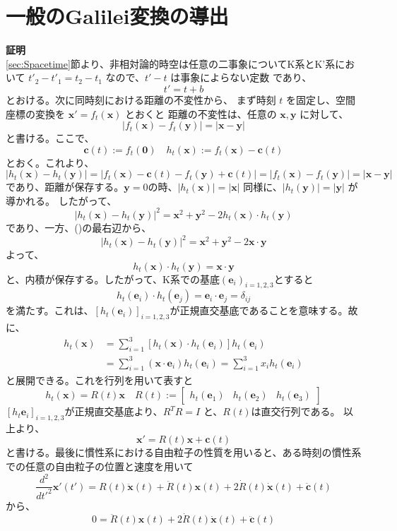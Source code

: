 \documentclass[a4paper,11pt]{ltjsarticle}
\begin{document}
\section{一般のGalilei変換の導出}
\label{sec:Hosoku}
\textbf{証明}
\\\ref{sec:Spacetime}節より、非相対論的時空は任意の二事象についてK系とK'系において \(t'_2-t'_1=t_2-t_1\) なので、\(t'-t\) は事象によらない定数
であり、
\[
t'=t+b
\]
とおける。次に同時刻における距離の不変性から、
まず時刻 \(t\) を固定し、空間座標の変換を \(\bm x'=f_t(\bm x)\) とおくと
距離の不変性は、任意の \(\bm x,\bm y\) に対して、
\[
|f_t(\bm{x})-f_t(\bm{y})|=|\bm{x}-\bm{y}|
\]
と書ける。ここで、
\[
\bm{c}(t):=f_t(\bm{0}) \quad h_t(\bm{x}):=f_t(\bm{x})-\bm{c}(t)
\]
とおく。これより、
\begin{equation}
|h_t(\bm{x})-h_t(\bm{y})|=|f_t(\bm{x})-\bm{c}(t)-f_t(\bm{y})+\bm{c}(t)|=|{f_t(\bm{x})}-f_t(\bm{y})|=|\bm{x}-\bm{y}|
\label{eq:h}
\end{equation}
であり、距離が保存する。$\bm{y}=0$の時、$|h_t(\bm{x})|=|\bm{x}|$ 同様に、$|h_t(\bm{y})|=|\bm{y}|$ が導かれる。
したがって、
\[
|h_t(\bm{x})-h_t(\bm{y})|^2=\bm{x}^2+\bm{y}^2-2h_t(\bm{x})\cdot h_t(\bm{y})
\]
であり、一方、()の最右辺から、
\[
|h_t(\bm{x})-h_t(\bm{y})|^2=\bm{x}^2+\bm{y}^2-2\bm{x}\cdot\bm{y}
\]
よって、
\[
h_t(\bm{x})\cdot h_t(\bm{y})=\bm{x}\cdot\bm{y}
\]
と、内積が保存する。したがって、K系での基底$(\bm{e}_i)_{i=1,2,3}$とすると
\[
h_t(\bm{e}_i)\cdot h_t(\bm{e}_j)=\bm{e}_i\cdot\bm{e}_j=\delta_{ij}
\]
を満たす。これは、$[h_t(\bm{e}_i)]_{i=1,2,3}$が正規直交基底であることを意味する。故に、
\begin{align*}
h_t(\bm{x})&=\sum_{i=1}^{3}\left[h_t(\bm{x})\cdot h_t(\bm{e}_i)\right]h_t(\bm{e}_i)
\\&=\sum_{i=1}^{3}(\bm{x}\cdot\bm{e}_i)h_t(\bm{e}_i)=\sum_{i=1}^{3}x_ih_t(\bm{e}_i)
\end{align*}
と展開できる。これを行列を用いて表すと
\[
h_t(\bm{x})=R(t)\bm{x} \quad R(t):=\begin{bmatrix}h_t(\bm{e}_1) & h_t(\bm{e}_2) & h_t(\bm{e}_3)\end{bmatrix}
\]
$[h_t{\bm{e}_i}]_{i=1,2,3}$が正規直交基底より、$R^TR=I$ と、$R(t)$は直交行列である。
以上より、
\[
\bm{x}'=R(t)\bm{x}+\bm{c}(t)
\]
と書ける。最後に慣性系における自由粒子の性質を用いると、ある時刻の慣性系での任意の自由粒子の位置と速度を用いて
\[
\frac{d^2}{dt'^2}\bm{x}'(t')=R(t)\ddot{\bm{x}}(t)+\ddot{R}(t)\bm{x}(t)+2\dot{R}(t)\dot{\bm{x}}(t)+\ddot{\bm{c}}(t)
\]
から、
\begin{equation}
0=\ddot{R}(t)\bm{x}(t)+2\dot{R}(t)\dot{\bm{x}}(t)+\ddot{\bm{c}}(t)
\label{eq:R}
\end{equation}
\end{document}
